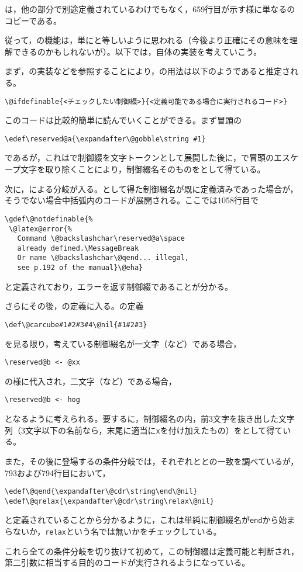 \documentclass[autodetect-engine,dvipdfmx]{jsarticle}
\begin{document}
は，他の部分で別途定義されているわけでもなく，659行目が示す様に単なるのコピーである。

従って，の機能は，単にと等しいように思われる（今後より正確にその意味を理解できるのかもしれないが）。以下では，自体の実装を考えていこう。

まず，の実装などを参照することにより，の用法は以下のようであると推定される。
\texsource
\begin{lstlisting}
\@ifdefinable{<チェックしたい制御綴>}{<定義可能である場合に実行されるコード>}
\end{lstlisting}

このコードは比較的簡単に読んでいくことができる。まず冒頭の
\begin{lstlisting}
\edef\reserved@a{\expandafter\@gobble\string #1}
\end{lstlisting}
であるが，これはで制御綴を文字トークンとして展開した後に，で冒頭のエスケープ文字を取り除くことにより，制御綴名そのものをとして得ている。

次に，による分岐が入る。として得た制御綴名が既に定義済みであった場合が，そうでない場合中括弧内のコードが展開される。ここでは1058行目で
\latexltx
\begin{lstlisting}[firstnumber=1058]
\gdef\@notdefinable{%
 \@latex@error{%
   Command \@backslashchar\reserved@a\space
   already defined.\MessageBreak
   Or name \@backslashchar\@qend... illegal,
   see p.192 of the manual}\@eha}
\end{lstlisting}
と定義されており，エラーを返す制御綴であることが分かる。

さらにその後，の定義に入る。の定義
\begin{lstlisting}[firstnumber=582]
\def\@carcube#1#2#3#4\@nil{#1#2#3}
\end{lstlisting}
を見る限り，考えている制御綴名が一文字（など）である場合，
\texsource
\begin{lstlisting}
\reserved@b <- @xx
\end{lstlisting}
の様に代入され，二文字（など）である場合，
\begin{lstlisting}
\reserved@b <- hog
\end{lstlisting}
となるように考えられる。要するに，制御綴名の内，前3文字を抜き出した文字列（3文字以下の名前なら，末尾に適当に\texttt{x}を付け加えたもの）をとして得ている。

また，その後に登場するの条件分岐では，それぞれととの一致を調べているが，793および794行目において，
\latexltx
\begin{lstlisting}[firstnumber=793]
\edef\@qend{\expandafter\@cdr\string\end\@nil}
\edef\@qrelax{\expandafter\@cdr\string\relax\@nil}
\end{lstlisting}
と定義されていることから分かるように，これは単純に制御綴名が\texttt{end}から始まらないか，\texttt{relax}という名では無いかをチェックしている。

これら全ての条件分岐を切り抜けて初めて，この制御綴は定義可能と判断され，第二引数に相当する目的のコードが実行されるようになっている。
\end{document}

